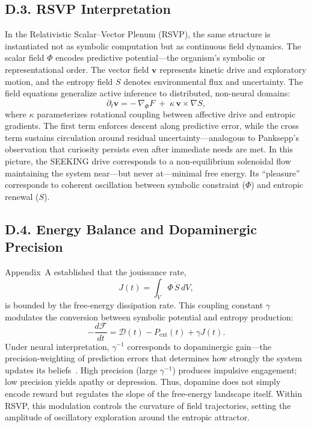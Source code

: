 \documentclass[12pt,a4paper]{article}
\begin{document}
\subsection*{D.3. RSVP Interpretation}

In the Relativistic Scalar–Vector Plenum (RSVP), the same structure is instantiated not as symbolic computation but as continuous field dynamics.  
The scalar field $\Phi$ encodes predictive potential—the organism’s symbolic or representational order.  
The vector field $\mathbf{v}$ represents kinetic drive and exploratory motion, and the entropy field $S$ denotes environmental flux and uncertainty.  
The field equations generalize active inference to distributed, non-neural domains:
\[
\partial_t \mathbf{v} = -\,\nabla_{\Phi}F \;+\; \kappa\,\mathbf{v}\!\times\!\nabla S,
\]
where $\kappa$ parameterizes rotational coupling between affective drive and entropic gradients.  
The first term enforces descent along predictive error, while the cross term sustains circulation around residual uncertainty—analogous to Panksepp’s observation that curiosity persists even after immediate needs are met.  
In this picture, the \textsc{SEEKING} drive corresponds to a non-equilibrium solenoidal flow maintaining the system near—but never at—minimal free energy.  
Its “pleasure” corresponds to coherent oscillation between symbolic constraint ($\Phi$) and entropic renewal ($S$).

\subsection*{D.4. Energy Balance and Dopaminergic Precision}

Appendix~A established that the jouissance rate,
\[
J(t) = \int_V \Phi\,\dot{S}\,dV,
\]
is bounded by the free-energy dissipation rate.  
This coupling constant $\gamma$ modulates the conversion between symbolic potential and entropy production:
\[
-\frac{d\mathcal{F}}{dt} = \mathcal{D}(t) - P_{\text{ext}}(t) + \gamma J(t).
\]
Under neural interpretation, $\gamma^{-1}$ corresponds to dopaminergic gain—the precision-weighting of prediction errors that determines how strongly the system updates its beliefs~\citep{friston2017dopamine}.  
High precision (large $\gamma^{-1}$) produces impulsive engagement; low precision yields apathy or depression.  
Thus, dopamine does not simply encode reward but regulates the slope of the free-energy landscape itself.  
Within RSVP, this modulation controls the curvature of field trajectories, setting the amplitude of oscillatory exploration around the entropic attractor.
\end{document}
